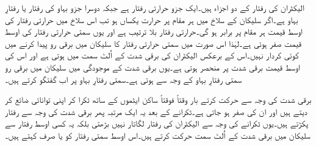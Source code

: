 الیکٹران کی رفتار کے دو اجزاء ہیں۔ایک جزو حرارتی رفتار ہے جبکہ دوسرا جزو بہاو کی رفتار یا رفتارِ بہاو ہے۔اگر سلیکان کے سلاخ میں ہر مقام پر حرارت یکساں ہو تب اس سلاخ میں حرارتی رفتار کی اوسط قیمت ہر مقام پر برابر ہو گی۔حرارتی رفتار بلا ترتیب ہے اور یوں سمتی حرارتی رفتار کی اوسط قیمت صفر ہوتی ہے۔لہٰذا اس صورت میں سمتی حرارتی رفتار کا سلیکان میں برقی رو پیدا کرنے میں کوئی کردار نہیں۔اس کے برعکس الیکٹران کی   برقی شدت کے اُلٹ سمت میں ہوتی ہے اور اس کی اوسط قیمت برقی شدت پر منحصر ہوتی ہے۔یوں برقی شدت کے موجودگی میں سلیکان میں برقی رو سمتی رفتارِ بہاو کے وجہ سے ہوتی ہے۔سمتی رفتارِ بہاو پر اب گفتگو کرتے ہیں۔

برقی شدت کی وجہ سے حرکت کرتے بار وقتاً فوقتاً ساکن ایٹموں کے ساتھ ٹکرا کر اپنی توانائی ضائع کر دیتے ہیں اور ان کی   صفر ہو جاتی ہے۔ٹکرانے کے بعد یہ ایک مرتبہ پھر برقی شدت کی وجہ سے رفتار پکڑتے ہیں۔یوں ٹکرانے کی وجہ سے الیکٹران کی رفتار لگاتار نہیں بڑھتی بلکہ یہ کسی اوسط رفتار سے سلیکان میں برقی شدت کے اُلٹ سمت حرکت کرتے ہیں۔اس اوسط سمتی رفتار کو   یا صرف  کہتے ہیں۔ 


